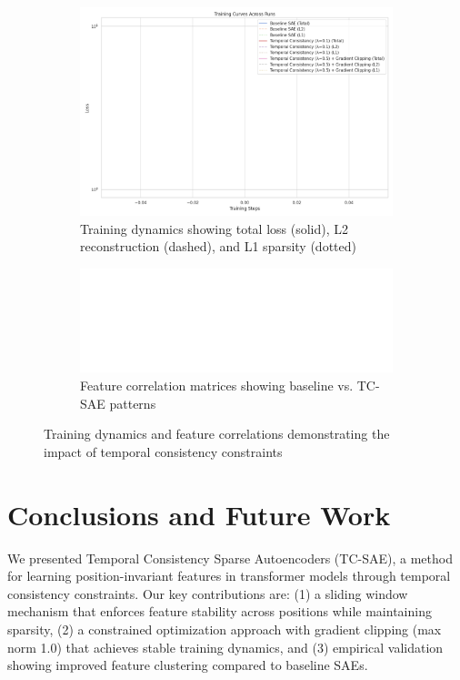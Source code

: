 \documentclass{article} %
\begin{document}
\begin{figure}[t]
    \centering
    \begin{subfigure}{0.48\textwidth}
        \includegraphics[width=\textwidth]{training_curves.png}
        \caption{Training dynamics showing total loss (solid), L2 reconstruction (dashed), and L1 sparsity (dotted)}
        \label{fig:training_curves}
    \end{subfigure}
    \hfill
    \begin{subfigure}{0.48\textwidth}
        \includegraphics[width=\textwidth]{feature_correlations.png}
        \caption{Feature correlation matrices showing baseline vs. TC-SAE patterns}
        \label{fig:feature_correlations}
    \end{subfigure}
    \caption{Training dynamics and feature correlations demonstrating the impact of temporal consistency constraints}
    \label{fig:results}
\end{figure}

\section{Conclusions and Future Work}
\label{sec:conclusion}

We presented Temporal Consistency Sparse Autoencoders (TC-SAE), a method for learning position-invariant features in transformer models through temporal consistency constraints. Our key contributions are: (1) a sliding window mechanism that enforces feature stability across positions while maintaining sparsity, (2) a constrained optimization approach with gradient clipping (max norm 1.0) that achieves stable training dynamics, and (3) empirical validation showing improved feature clustering compared to baseline SAEs.
\end{document}

